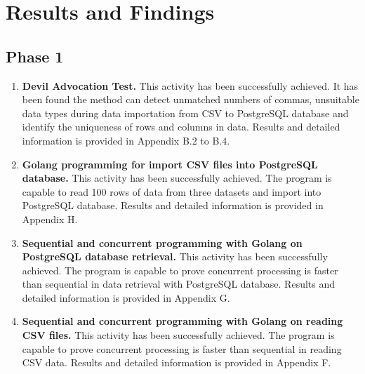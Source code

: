 \chapter{Results and Findings} 

\label{Chapter6} 


\doublespacing



\section{Phase 1}

\begin{enumerate}[topsep=0pt,itemsep=-1ex,partopsep=1ex,parsep=1.5ex]
	
	\item \textbf{Devil Advocation Test.}
	This activity has been successfully achieved. It has been found the method can detect unmatched numbers of commas, unsuitable data types during data importation from CSV to PostgreSQL database and identify the uniqueness of rows and columns in data. Results and detailed information is provided in Appendix B.2 to B.4.
	
	\item \textbf{Golang programming for import CSV files into PostgreSQL database.}
	This activity has been successfully achieved. The program is capable to read 100 rows of data from three datasets and import into PostgreSQL database. Results and detailed information is provided in Appendix H.
	
	\pagebreak
	
	\item \textbf{Sequential and concurrent programming with Golang on PostgreSQL database retrieval.}
	This activity has been successfully achieved. The program is capable to prove concurrent processing is faster than sequential in data retrieval with PostgreSQL database. Results and detailed information is provided in Appendix G.
	
	\item \textbf{Sequential and concurrent programming with Golang on reading CSV files.}
	This activity has been successfully achieved. The program is capable to prove concurrent processing is faster than sequential in reading CSV data. Results and detailed information is provided in Appendix F.
	
\end{enumerate}

